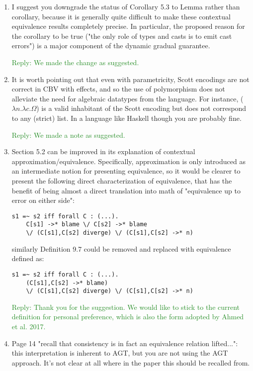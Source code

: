 \documentclass[dvipsnames]{article}
\newcommand\mynote[3]{\textcolor{#2}{#1: #3}}
\newcommand\ningning[1]{\mynote{Ningning}{orange}{#1}}
\newcommand\reply[1]{\textcolor{ForestGreen}{Reply: #1}}
\begin{document}
\begin{enumerate}
\item I suggest you downgrade the status of Corollary 5.3 to Lemma rather than
  corollary, because it is generally quite difficult to make these contextual
  equivalence results completely precise. In particular, the proposed reason for
  the corollary to be true ("the only role of types and casts is to emit cast
  errors") is a major component of the dynamic gradual guarantee.

\reply{We made the change as suggested.}

\item It is worth pointing out that even with parametricity, Scott encodings are
  not correct in CBV with effects, and so the use of polymorphism does not
  alleviate the need for algebraic datatypes from the language. For instance,
  ($\lambda n. \lambda c. \Omega$) is a valid inhabitant of the Scott encoding
  but does not correspond to any (strict) list. In a language like Haskell
  though you are probably fine.

\reply{We made a note as suggested.}

\item Section 5.2 can be improved in its explanation of contextual
  approximation/equivalence. Specifically, approximation is only introduced as
  an intermediate notion for presenting equivalence, so it would be clearer to
  present the following direct characterization of equivalence, that has the
  benefit of being almost a direct translation into math of "equivalence up to
  error on either side":
\begin{verbatim}
s1 =~ s2 iff forall C : (...).
    C[s1] ->* blame \/ C[s2] ->* blame
    \/ (C[s1],C[s2] diverge) \/ (C[s1],C[s2] ->* n)
\end{verbatim}
  similarly Definition 9.7 could be removed and replaced with equivalence
  defined as:
\begin{verbatim}
s1 =~ s2 iff forall C : (...).
    (C[s1],C[s2] ->* blame)
    \/ (C[s1],C[s2] diverge) \/ (C[s1],C[s2] ->* n)
\end{verbatim}
  \reply{ Thank you for the suggestion. We would like to stick to the current
    definition for personal preference, which is also the form adopted by Ahmed
    et al. 2017.
  }

\item Page 14 "recall that consistency is in fact an equivalence relation
  lifted...": this interpretation is inherent to AGT, but you are not using the
  AGT approach. It's not clear at all where in the paper this should be recalled
  from.


\end{enumerate}
\end{document}

